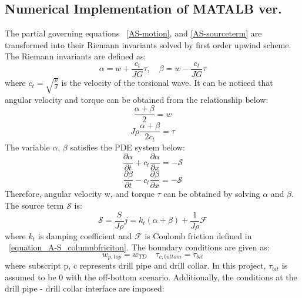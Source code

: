 \subsection{Numerical Implementation of MATALB ver.}
The partial governing equations \equationname~\ref{AS-motion}, and \ref{AS-sourceterm} are transformed into their Riemann invariants solved by first order upwind scheme. The Riemann invariants are defined as:
\begin{equation}\label{AS-Riemann}
  \alpha = w + \frac{c_t}{JG}\tau, \quad \beta=w-\frac{c_t}{JG}\tau
\end{equation}
where $c_t = \sqrt{\frac{\rho}{J}}$ is the velocity of the torsional wave. It can be noticed that angular velocity and torque can be obtained from the relationship below: 
\begin{equation}\label{equation_Riemann_relation1}
  \frac{\alpha + \beta}{2} = w
\end{equation}
\begin{equation}\label{equation_Riemann_relation2}
  J \rho \frac{\alpha + \beta}{2c_t} = \tau
\end{equation}
The variable $\alpha$, $\beta$ satisfies the PDE system below: 
\begin{equation}\label{AS-Riemann_alpha}
  \frac{\partial \alpha}{\partial t} + c_t\frac{\partial \alpha}{\partial x} = -\mathcal{S}
\end{equation}
\begin{equation}\label{AS-Riemann_beta}
  \frac{\partial \beta}{\partial t} - c_t\frac{\partial \beta}{\partial x} = -\mathcal{S}
\end{equation}
Therefore, angular velocity w, and torque $\tau$ can be obtained by solving $\alpha$ and $\beta$.
The source term $\mathcal{S}$ is:
\begin{equation}\label{AS-source}
  \mathcal{S} = \frac{S}{J \rho} j= k_t(\alpha + \beta) + \frac{1}{J \rho} \mathcal{F}
\end{equation}
where $k_t$ is damping coefficient and $\mathcal{F}$ is Coulomb friction defined in \equationname~\ref{equation_A-S_columnbfriciton}. The boundary conditions are given as:
\begin{equation}\label{AS-BC}
  w_{p,top} = w_{TD} \quad \tau_{c,bottom} = \tau_{bit}
\end{equation}
where subscript p, c represents drill pipe and drill collar. In this project, $\tau_{bit}$ is assumed to be 0 with the off-bottom scenario. 
Additionally, the conditions at the drill pipe - drill collar interface are imposed:
